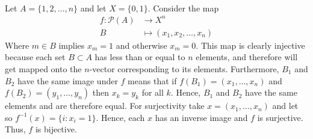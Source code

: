 \documentclass{article}
\DeclareMathOperator{\lra}{\longrightarrow}
\newcommand{\problem}[1]{\noindent{\textbf{Problem #1}}\\}
\begin{document}
\problem{1.6.6} Let $A = \{1,2,\ldots, n\}$ and let $X = \{0,1\}$. Consider the map
\begin{align*}
f: \mathcal{P}(A) &\lra X^n \\
B &\mapsto (x_1, x_2, \ldots, x_n)
\end{align*} 
Where $m \in B$ implies $x_m = 1$ and otherwise $x_m = 0$. This map is clearly injective because each set $B \subset A$ has less than or equal to $n$ elements, and therefore will get mapped onto the $n$-vector corresponding to its elements. Furthermore, $B_1$ and $B_2$ have the same image under $f$ means that if $f(B_1) = (x_1,\ldots, x_n)$ and $f(B_2) = (y_1,\ldots, y_n)$ then $x_k = y_k$ for all $k$. Hence, $B_1$ and $B_2$ have the same elements and are therefore equal. For surjectivity take $x = (x_1,\ldots,x_n)$ and let so $f^{-1}(x) = \{i : x_i = 1\}$. Hence, each $x$ has an inverse image and $f$ is surjective. Thus, $f$ is bijective. 
\end{document}
